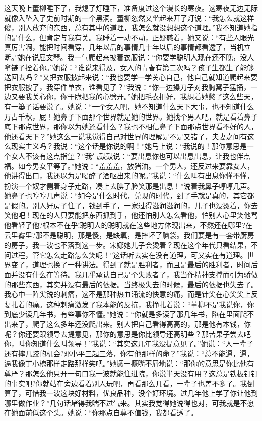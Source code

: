 \documentclass[12pt,oneside]{book}
\begin{document}
这天晚上董柳睡下了，我熄了灯睡下，准备度过这个漫长的寒夜。这寒夜无边无际就像入坠入了史前时期的一个黑洞。董柳忽然又坐起来开了灯说：``我怎么就这样傻，别人放弃的东西，总有其中的道理，我怎么就没想想这个道理。''我不知道她指的是什么，但肯定与我有关。我睡着一动不动，正疑惑着，她又说：``有些人眼光真厉害啊，能把时间看穿，几年以后的事情几十年以后的事情都看透了，当机立断。''她在说屈文琴。我一气爬起来披着衣服说：``你要学聪明人现在还不晚，没人拿链子拴着你。''她说：``谁说来得及，女人的青春有第二次吗？孩子生都生了能够送回去吗？''又把衣服披起来说：``我也要学一学关心自己，他自己就知道爬起来要把衣服披了，我穿件单衣，谁看见了？''我说：``你一边操刀子对我胸窝子猛捅，一边又要我关心你，你干脆把我的心劈开。''她把毛衣扣好，我想着她憋了这么些天，有一篓子话要说了。她说：``一个女人吧，她不知道什么天下大事，也不知道什么万古千秋，屁！她鼻子下面那个世界就是她的世界。她找个男人吧，就是看着鼻子底下那点世界，那你以为她还看什么？我也不相信鼻子下面那点世界看不好的人，他还看天下？''她这么一说我觉得自己对世界的理解是不是又错了，夫妻之间有这么现实主义吗？我说：``这个话是你说的啊！''她马上说：``我说的！那你意思是一个女人不该有这点指望？''我气鼓鼓说：``要出息你也可以出息出息，让我也伴点福。如今男女平等了。''她说：``羞羞羞，放猪油。一个男人，还反过来要靠女人，他讲得出口，我还以为是喝醉了酒呕出来的呢。''我说：``什么叫有出息你懂不懂，扮演一个奴才侧着身子走路，凑上去腆了脸笑那是出息！''说着我鼻子哼哼几声。她鼻子也哼哼几声说：``如今是什么时代，兑现的时代，到了手就是真的，其它都是假的。别人好房子住了，钱到手了，一家过得滋润滋润的，儿子也没烫着，你去笑他吧！现在的人只要能把东西抓到手，他还怕别人怎么看他，怕别人心里笑他骂他看轻了他?根本不在乎!聪明人的聪明就在这些地方体现出来，不然还在哪里?在云里雾里?那不是聪明，那是傻，是缺氧，是摔坏了脑袋。我们要是有一套带厨房的房子，我一波也不落到这一步。宋娜她儿子会烫着？现在这个年代只看结果，不问过程，管它怎么走路怎么笑呢！''这话听去实在没有道理，可又实在有道理。世界变了，道理也换了一种讲法。得到了就是胜利者，而且是最后的胜利者，时间后面并没有什么在等待。我几乎承认自己是个失败者了，我当作精神支撑而引为骄傲的那些东西，其实并没有最后的依据。当终极失去的时候，最后的依据也失去了。我心中一阵尖锐的刺痛，这不是那种热血涌流的快意的痛，而是针尖在心尖尖上反复扎着的痛。这种刺痛激发了我本能的反抗，我挣扎着说：``董柳不是我说你，你到底少读几年书，有些事你不懂。''她说：``你就是多读了那几年书，陷在里面爬不出来了，爬了这么多年还没爬出来。别人把自己看得高高的，那是他有本钱，你呢？你还要跟领导去提意见，那你的意思是你比领导还高明些？那苦果子尝去吧你，叫你知道什么叫领导！''我说：``其实这几年我没提意见了。''她说：``人一辈子还有摔几跤的机会?邓小平三起三落，你有他那样的命？''我说：``总不能逼，逼，逼我像丁小槐那样走路那样笑吧。''她撅一撅嘴不屑地说：``那你的意思是你比他有尊严？那怎么他只开一句口我一波就能住进院，你说半天没有用？这总是铁板钉钉的事实吧?你就站在旁边看着别人玩吧，再看那么几看，一辈子也差不多了。我倒算了，可惜我一波这块好材料，优良品种，没个好环境。过几年他上学了你让他到哪里做作业？''几句话堵得我喘不过气来。其实我觉得她说得也对，可我就是不愿在她面前低这个头。她说：``你那点自尊不值钱，我都看透了。
\end{document}
